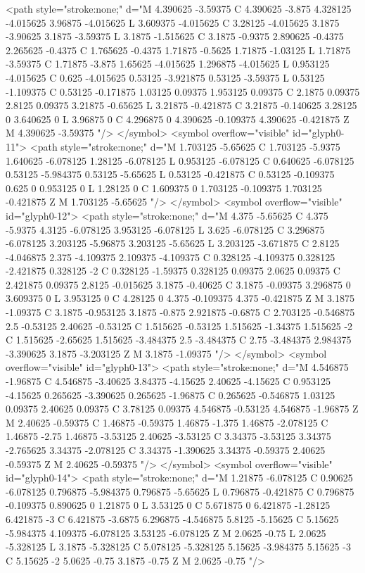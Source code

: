 <path style="stroke:none;" d="M 4.390625 -3.59375 C 4.390625 -3.875 4.328125 -4.015625 3.96875 -4.015625 L 3.609375 -4.015625 C 3.28125 -4.015625 3.1875 -3.90625 3.1875 -3.59375 L 3.1875 -1.515625 C 3.1875 -0.9375 2.890625 -0.4375 2.265625 -0.4375 C 1.765625 -0.4375 1.71875 -0.5625 1.71875 -1.03125 L 1.71875 -3.59375 C 1.71875 -3.875 1.65625 -4.015625 1.296875 -4.015625 L 0.953125 -4.015625 C 0.625 -4.015625 0.53125 -3.921875 0.53125 -3.59375 L 0.53125 -1.109375 C 0.53125 -0.171875 1.03125 0.09375 1.953125 0.09375 C 2.1875 0.09375 2.8125 0.09375 3.21875 -0.65625 L 3.21875 -0.421875 C 3.21875 -0.140625 3.28125 0 3.640625 0 L 3.96875 0 C 4.296875 0 4.390625 -0.109375 4.390625 -0.421875 Z M 4.390625 -3.59375 "/>
</symbol>
<symbol overflow="visible" id="glyph0-11">
<path style="stroke:none;" d="M 1.703125 -5.65625 C 1.703125 -5.9375 1.640625 -6.078125 1.28125 -6.078125 L 0.953125 -6.078125 C 0.640625 -6.078125 0.53125 -5.984375 0.53125 -5.65625 L 0.53125 -0.421875 C 0.53125 -0.109375 0.625 0 0.953125 0 L 1.28125 0 C 1.609375 0 1.703125 -0.109375 1.703125 -0.421875 Z M 1.703125 -5.65625 "/>
</symbol>
<symbol overflow="visible" id="glyph0-12">
<path style="stroke:none;" d="M 4.375 -5.65625 C 4.375 -5.9375 4.3125 -6.078125 3.953125 -6.078125 L 3.625 -6.078125 C 3.296875 -6.078125 3.203125 -5.96875 3.203125 -5.65625 L 3.203125 -3.671875 C 2.8125 -4.046875 2.375 -4.109375 2.109375 -4.109375 C 0.328125 -4.109375 0.328125 -2.421875 0.328125 -2 C 0.328125 -1.59375 0.328125 0.09375 2.0625 0.09375 C 2.421875 0.09375 2.8125 -0.015625 3.1875 -0.40625 C 3.1875 -0.09375 3.296875 0 3.609375 0 L 3.953125 0 C 4.28125 0 4.375 -0.109375 4.375 -0.421875 Z M 3.1875 -1.09375 C 3.1875 -0.953125 3.1875 -0.875 2.921875 -0.6875 C 2.703125 -0.546875 2.5 -0.53125 2.40625 -0.53125 C 1.515625 -0.53125 1.515625 -1.34375 1.515625 -2 C 1.515625 -2.65625 1.515625 -3.484375 2.5 -3.484375 C 2.75 -3.484375 2.984375 -3.390625 3.1875 -3.203125 Z M 3.1875 -1.09375 "/>
</symbol>
<symbol overflow="visible" id="glyph0-13">
<path style="stroke:none;" d="M 4.546875 -1.96875 C 4.546875 -3.40625 3.84375 -4.15625 2.40625 -4.15625 C 0.953125 -4.15625 0.265625 -3.390625 0.265625 -1.96875 C 0.265625 -0.546875 1.03125 0.09375 2.40625 0.09375 C 3.78125 0.09375 4.546875 -0.53125 4.546875 -1.96875 Z M 2.40625 -0.59375 C 1.46875 -0.59375 1.46875 -1.375 1.46875 -2.078125 C 1.46875 -2.75 1.46875 -3.53125 2.40625 -3.53125 C 3.34375 -3.53125 3.34375 -2.765625 3.34375 -2.078125 C 3.34375 -1.390625 3.34375 -0.59375 2.40625 -0.59375 Z M 2.40625 -0.59375 "/>
</symbol>
<symbol overflow="visible" id="glyph0-14">
<path style="stroke:none;" d="M 1.21875 -6.078125 C 0.90625 -6.078125 0.796875 -5.984375 0.796875 -5.65625 L 0.796875 -0.421875 C 0.796875 -0.109375 0.890625 0 1.21875 0 L 3.53125 0 C 5.671875 0 6.421875 -1.28125 6.421875 -3 C 6.421875 -3.6875 6.296875 -4.546875 5.8125 -5.15625 C 5.15625 -5.984375 4.109375 -6.078125 3.53125 -6.078125 Z M 2.0625 -0.75 L 2.0625 -5.328125 L 3.1875 -5.328125 C 5.078125 -5.328125 5.15625 -3.984375 5.15625 -3 C 5.15625 -2 5.0625 -0.75 3.1875 -0.75 Z M 2.0625 -0.75 "/>
